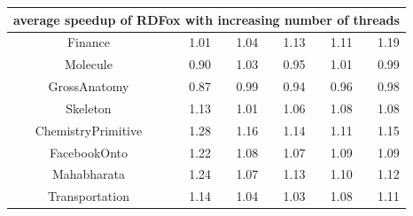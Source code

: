 \begin{table}[htb]
{\begin{tabular}{crrrrr}
\hline
\multicolumn{6}{c}{average speedup of RDFox with increasing
  number of threads}\\%
\hline
Finance&1.01&1.04&1.13&1.11&1.19\\
Molecule&0.90&1.03&0.95&1.01&0.99\\
GrossAnatomy&0.87&0.99&0.94&0.96&0.98\\
Skeleton&1.13&1.01&1.06&1.08&1.08\\
ChemistryPrimitive&1.28&1.16&1.14&1.11&1.15\\
FacebookOnto&1.22&1.08&1.07&1.09&1.09\\
Mahabharata&1.24&1.07&1.13&1.10&1.12\\
Transportation&1.14&1.04&1.03&1.08&1.11\\
\hline
\end{tabular}
}
\end{table}
